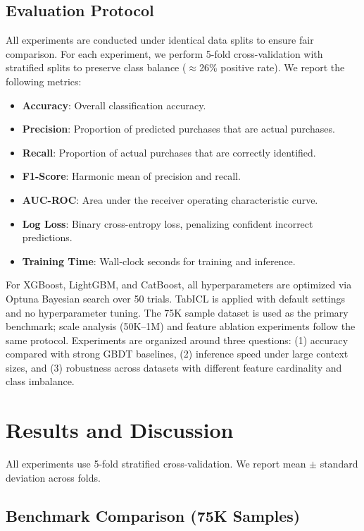 \documentclass[conference]{IEEEtran}
\begin{document}
\subsection{Evaluation Protocol}

All experiments are conducted under identical data splits to ensure fair comparison. For each experiment, we perform 5-fold cross-validation with stratified splits to preserve class balance ($\approx$26\% positive rate). We report the following metrics:

\begin{itemize}
  \item \textbf{Accuracy}: Overall classification accuracy.
  \item \textbf{Precision}: Proportion of predicted purchases that are actual purchases.
  \item \textbf{Recall}: Proportion of actual purchases that are correctly identified.
  \item \textbf{F1-Score}: Harmonic mean of precision and recall.
  \item \textbf{AUC-ROC}: Area under the receiver operating characteristic curve.
  \item \textbf{Log Loss}: Binary cross-entropy loss, penalizing confident incorrect predictions.
  \item \textbf{Training Time}: Wall-clock seconds for training and inference.
\end{itemize}

For XGBoost, LightGBM, and CatBoost, all hyperparameters are optimized via Optuna Bayesian search over 50 trials. TabICL is applied with default settings and no hyperparameter tuning. The 75K sample dataset is used as the primary benchmark; scale analysis (50K--1M) and feature ablation experiments follow the same protocol.
Experiments are organized around three questions: (1) accuracy compared with strong GBDT baselines, (2) inference speed under large context sizes, and (3) robustness across datasets with different feature cardinality and class imbalance.

\section{Results and Discussion}

All experiments use 5-fold stratified cross-validation. We report mean $\pm$ standard deviation across folds.

\subsection{Benchmark Comparison (75K Samples)}
\end{document}
